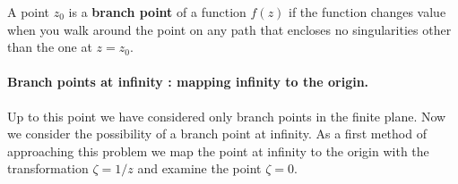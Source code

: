 \begin{Example}
\end{Example}

















\begin{Result}
  A point $z_0$ is a \textbf{branch point} of a function $f(z)$ if
  the function changes value when you walk around the point on any
  path that encloses no singularities other than the one at $z = z_0$.
\end{Result}



\paragraph{Branch points at infinity : mapping infinity to the origin.}
Up to this point we have considered only branch points in the finite
plane.  Now we consider the possibility of a branch point at infinity.
As a first method of approaching this problem we map the point at
infinity to the origin with the transformation $\zeta = 1 / z$ and
examine the point $\zeta = 0$.






